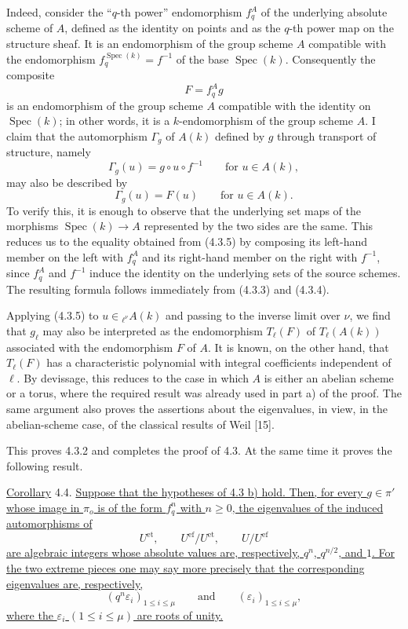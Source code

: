 Indeed, consider the ``$q$-th power'' endomorphism $f_q^A$ of the
underlying absolute scheme of $A$, defined as the identity on points and
as the $q$-th power map on the structure sheaf.  It is an endomorphism of
the group scheme $A$ compatible with the endomorphism
$f_q^{\operatorname{Spec}(k)}=f^{-1}$ of the base
$\operatorname{Spec}(k)$.  Consequently the composite
\begin{equation}\tag{4.3.3}
 F=f_q^A g
\end{equation}
is an endomorphism of the group scheme $A$ compatible with the identity
on $\operatorname{Spec}(k)$; in other words, it is a $k$-endomorphism of
the group scheme $A$.  I claim that the automorphism $\Gamma_g$ of $A(k)$
defined by $g$ through transport of structure, namely
\begin{equation}\tag{4.3.4}
 \Gamma_g(u)=g\circ u\circ f^{-1}
 \qquad\text{for }u\in A(k),
\end{equation}
may also be described by
\begin{equation}\tag{4.3.5}
 \Gamma_g(u)=F(u)
 \qquad\text{for }u\in A(k).
\end{equation}
To verify this, it is enough to observe that the underlying set maps of
the morphisms $\operatorname{Spec}(k)\longrightarrow A$ represented by
the two sides are the same.  This reduces us to the equality obtained
from (4.3.5) by composing its left-hand member on the left with $f_q^A$
and its right-hand member on the right with $f^{-1}$, since $f_q^A$ and
$f^{-1}$ induce the identity on the underlying sets of the source
schemes.  The resulting formula follows immediately from (4.3.3) and
(4.3.4).

Applying (4.3.5) to $u\in{}_{\ell^\nu}A(k)$ and passing to the inverse
limit over $\nu$, we find that $g_\ell$ may also be interpreted as the
endomorphism $T_\ell(F)$ of $T_\ell(A(k))$ associated with the
endomorphism $F$ of $A$.  It is known, on the other hand, that
$T_\ell(F)$ has a characteristic polynomial with integral coefficients
independent of $\ell$.  By devissage, this reduces to the case in which
$A$ is either an abelian scheme or a torus, where the required result was
already used in part a) of the proof.  The same argument also proves the
assertions about the eigenvalues, in view, in the abelian-scheme case, of
the classical results of Weil [15].

This proves 4.3.2 and completes the proof of 4.3.  At the same time it
proves the following result.

\medskip
\noindent
\underline{Corollary} 4.4. \underline{Suppose that the hypotheses of
4.3 b) hold.  Then, for every $g\in\pi'$ whose image in $\pi_o$ is of the
form $f_q^n$ with $n\geq0$, the eigenvalues of the induced automorphisms
of}
\[
 U^{\mathrm{et}},\qquad
 U^{\mathrm{ef}}/U^{\mathrm{et}},\qquad
 U/U^{\mathrm{ef}}
\]
\underline{are algebraic integers whose absolute values are,
respectively, $q^n$, $q^{n/2}$, and $1$.  For the two extreme pieces one
may say more precisely that the corresponding eigenvalues are,
respectively,}
\[
 (q^n\varepsilon_i)_{1\leq i\leq\mu}
 \qquad\text{and}\qquad
 (\varepsilon_i)_{1\leq i\leq\mu},
\]
\underline{where the $\varepsilon_i$ $(1\leq i\leq\mu)$ are roots of
unity.}

